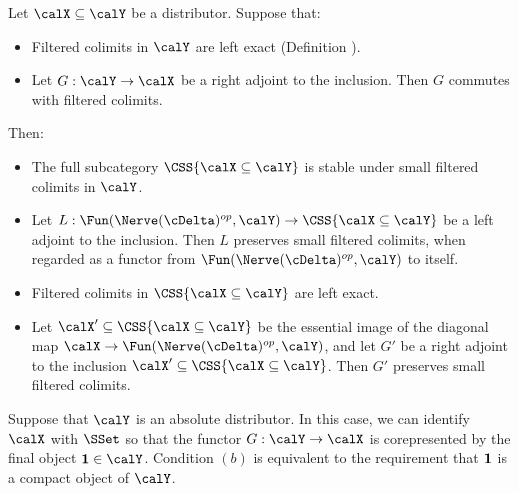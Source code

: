 \begin{proposition}\label{presmashet}
Let $\calX \subseteq \calY$ be a distributor. Suppose that:
\begin{itemize}
\item[$(a)$] Filtered colimits in $\calY$ are left exact (Definition ).
\item[$(b)$] Let $G: \calY \rightarrow \calX$ be a right adjoint to the inclusion. Then $G$ commutes with filtered colimits.
\end{itemize}
Then:
\begin{itemize}
\item[$(1)$] The full subcategory $\CSS{ \calX \subseteq \calY}$ is stable under small filtered colimits
in $\calY$.
\item[$(2)$] Let $L: \Fun( \Nerve(\cDelta)^{op}, \calY) \rightarrow \CSS{ \calX \subseteq \calY}$
be a left adjoint to the inclusion. Then $L$ preserves small filtered colimits, when regarded
as a functor from $\Fun( \Nerve(\cDelta)^{op}, \calY)$ to itself.
\item[$(3)$] Filtered colimits in $\CSS{ \calX \subseteq \calY}$ are left exact.
\item[$(4)$] Let $\calX' \subseteq \CSS{ \calX \subseteq \calY}$ be the essential image
of the diagonal map $\calX \rightarrow \Fun( \Nerve(\cDelta)^{op}, \calY)$, and let
$G'$ be a right adjoint to the inclusion $\calX' \subseteq \CSS{ \calX \subseteq \calY}$. Then
$G'$ preserves small filtered colimits.
\end{itemize}
\end{proposition}

\begin{remark}
Suppose that $\calY$ is an absolute distributor. In this case, we can identify
$\calX$ with $\SSet$ so that the functor $G: \calY \rightarrow \calX$ is corepresented by
the final object ${\bf 1} \in \calY$. Condition $(b)$ is equivalent to the requirement that
${\bf 1}$ is a compact object of $\calY$.
\end{remark}

